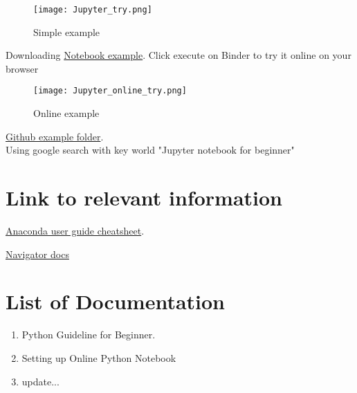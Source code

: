 \documentclass[a4paper,10pt]{article}
\begin{document}
\begin{figure}[H]
\centering\texttt{[image: Jupyter\_try.png]}
\caption[Short title]{Simple example}
\label{fig:ff9}\end{figure}

\vspace{1cm}

Downloading \href{https://nbviewer.jupyter.org/github/jupyter/notebook/blob/master/docs/source/examples/Notebook/Running\%20Code.ipynb#}{Notebook example}. Click execute on Binder to try it online on your browser


\begin{figure}[H]
\centering\texttt{[image: Jupyter\_online\_try.png]}
\caption[Short title]{Online example}
\label{fig:ff10}\end{figure}

\vspace{1cm}

\href{https://github.com/jupyter/notebook/blob/master/docs/source/examples/Notebook/Running\%20Code.ipynb}{Github example folder}.\\
Using google search with key world "Jupyter notebook for beginner"


\section{Link to relevant information}

\hspace{3ex}\href{https://docs.anaconda.com/anaconda/user-guide/cheatsheet/}{Anaconda user guide cheatsheet}.

\href{https://docs.anaconda.com/anaconda/navigator/}{Navigator docs}



\section{List of Documentation}

\begin{enumerate}
  \item Python Guideline for Beginner.
  \item Setting up Online Python Notebook
  \item update...
\end{enumerate}
\end{document}
